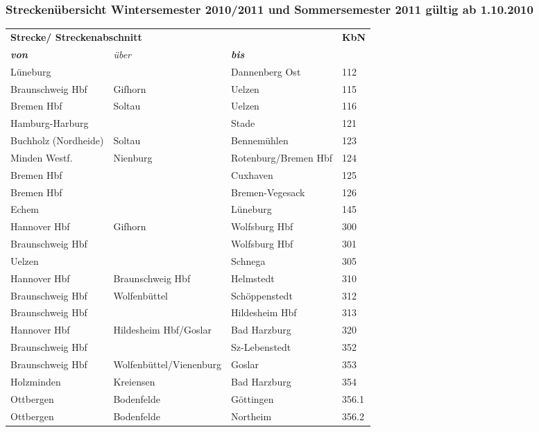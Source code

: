 \newpage
\begin{multicols}{2}
\subsubsection*{Streckenübersicht Wintersemester 2010/2011 und Sommersemester 2011 gültig ab 1.10.2010}
\label{streckenliste1}
\begin{tabular}{|l|l|l|p{2cm}|}
\hline
\multicolumn{3}{|l|}{\textbf{Strecke/ Streckenabschnitt}}& \textbf{KbN}\\
\textbf{\textit{von}} & \textit{über} & \textbf{\textit{bis}} & \\ \cline{ 1- 4}
Lüneburg &  & Dannenberg Ost & 112 \\ \hline
Braunschweig Hbf & Gifhorn & Uelzen & 115 \\ \hline
Bremen Hbf & Soltau & Uelzen & 116 \\ \hline
Hamburg-Harburg &  & Stade & 121 \\ \hline
Buchholz (Nordheide) & Soltau & Bennemühlen & 123 \\ \hline
Minden Westf. & Nienburg & Rotenburg/Bremen Hbf & 124 \\ \hline
Bremen Hbf &  & Cuxhaven & 125 \footnotemark[1] \\ \hline
Bremen Hbf &  & Bremen-Vegesack & 126 \footnotemark[1] \\ \hline
Echem &  & Lüneburg & 145 \\ \hline
Hannover Hbf & Gifhorn & Wolfsburg Hbf & 300 \\ \hline
Braunschweig Hbf &  & Wolfsburg Hbf & 301 \\ \hline
Uelzen &  & Schnega & 305 \\ \hline
Hannover Hbf & Braunschweig Hbf & Helmstedt & 310 \\ \hline
Braunschweig Hbf & Wolfenbüttel & Schöppenstedt & 312 \footnotemark[2] \\ \hline
Braunschweig Hbf &  & Hildesheim Hbf & 313 \\ \hline
Hannover Hbf & Hildesheim Hbf/Goslar & Bad Harzburg & 320 \\ \hline
Braunschweig Hbf &  & Sz-Lebenstedt & 352 \\ \hline
Braunschweig Hbf & Wolfenbüttel/Vienenburg & Goslar & 353 \\ \hline
Holzminden & Kreiensen & Bad Harzburg & 354 \\ \hline
Ottbergen & Bodenfelde & Göttingen & 356.1 \\ \hline
Ottbergen & Bodenfelde & Northeim & 356.2 \\ \hline

\end{tabular}
\end{multicols}
